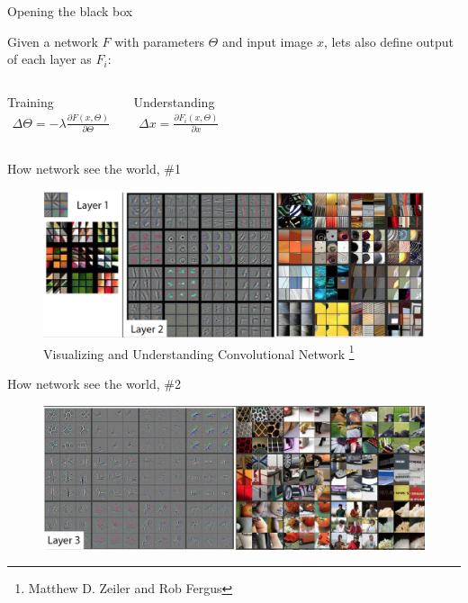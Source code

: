 \documentclass{beamer}
\begin{document}
\begin{frame}{Opening the black box}

Given a network $F$ with parameters $\Theta$ and input image $x$, lets also define output of each layer as $F_i$:
\begin{columns}[t]
\begin{block}{Training}
\begin{eqnarray*}
\Delta\Theta = -\lambda \frac{\partial F\left(x, \Theta \right)}{\partial \Theta}
\end{eqnarray*}
\end{block}
	
\begin{block}{Understanding}
\begin{eqnarray*}
\Delta x = \frac{\partial F_i\left(x, \Theta \right)}{\partial x}
\end{eqnarray*}
\end{block}
	
\end{columns}

\end{frame}


\begin{frame}{How network see the world, \#1}

\begin{figure}[h!]
  \centering
  \includegraphics[width=1\textwidth]{images/features1.png}
  \caption{Visualizing and Understanding Convolutional Network \footnote{Matthew D. Zeiler and Rob Fergus}}
\end{figure}

\end{frame}


\begin{frame}{How network see the world, \#2}

\begin{figure}[h!]
  \centering
  \includegraphics[width=1\textwidth]{images/features2.png}
\end{figure}

\end{frame}
\end{document}
